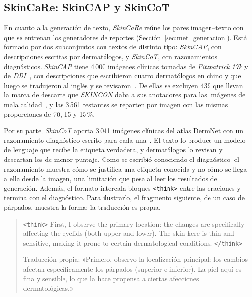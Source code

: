 \subsection{SkinCaRe: SkinCAP y SkinCoT}

En cuanto a la generación de texto, \emph{SkinCaRe} reúne los pares imagen--texto con que se entrenan los generadores
de reportes (Sección~\ref{sec:met_generacion}). Está formado por dos subconjuntos con textos de distinto tipo:
\emph{SkinCAP}, con descripciones escritas por dermatólogos, y \emph{SkinCoT}, con razonamientos diagnósticos.
\emph{SkinCAP} tiene 4\,000 imágenes clínicas tomadas de
\emph{Fitzpatrick 17k} y de \emph{DDI}~\cite{groh2021neural,daneshjou2022disparities}, con descripciones que
escribieron cuatro dermatólogos en chino y que luego se tradujeron al inglés y se revisaron~\cite{shen2025skincare}.
De ellas se excluyen 439 que llevan la marca de descarte que \emph{SKINCON} daba a sus anotadores
para las imágenes de mala calidad~\cite{daneshjou2022skincon}, y las 3\,561 restantes se reparten por imagen con las
mismas proporciones de 70, 15 y 15\,\%.

Por su parte, \emph{SkinCoT} aporta 3\,041 imágenes clínicas del atlas DermNet con un razonamiento diagnóstico escrito para cada
una~\cite{shen2025skincare}. El texto lo produce un modelo de lenguaje que recibe la etiqueta verdadera, y
dermatólogos lo revisan y descartan los de menor puntaje. Como se escribió conociendo el diagnóstico, el razonamiento
muestra cómo se justifica una etiqueta conocida y no cómo se llega a ella desde la imagen, una limitación que pesa al
leer los resultados de generación. Además, el formato intercala bloques \texttt{\textless{}think\textgreater{}} entre
las oraciones y termina con el diagnóstico. Para ilustrarlo, el fragmento siguiente, de un caso de párpados, muestra la
forma; la traducción es propia.

\begin{quote}
    \small
    \texttt{\textless{}think\textgreater{}} First, I observe the primary location: the changes are specifically affecting
    the eyelids (both upper and lower). The skin here is thin and sensitive, making it prone to certain dermatological
    conditions. \texttt{\textless{}/think\textgreater{}}

    \noindent Traducción propia: «Primero, observo la localización principal: los cambios afectan específicamente los
    párpados (superior e inferior). La piel aquí es fina y sensible, lo que la hace propensa a ciertas afecciones
    dermatológicas.»
\end{quote}

